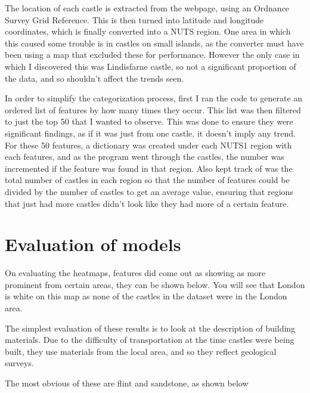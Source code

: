 \documentclass[11pt]{article}
\begin{document}
The location of each castle is extracted from the webpage, using an Ordnance Survey Grid Reference. This is then turned into latitude and longitude coordinates, which is finally converted into a NUTS region. One area in which this caused some trouble is in castles on small islands, as the converter must have been using a map that excluded these for performance. However the only case in which I discovered this was Lindisfarne castle, so not a significant proportion of the data, and so shouldn't affect the trends seen.

In order to simplify the categorization process, first I ran the code to generate an ordered list of features by how many times they occur. This list was then filtered to just the top 50 that I wanted to observe. This was done to ensure they were significant findings, as if it was just from one castle, it doesn't imply any trend. For these 50 features, a dictionary was created under each NUTS1 region with each features, and as the program went through the castles, the number was incremented if the feature was found in that region. Also kept track of was the total number of castles in each region so that the number of features could be divided by the number of castles to get an average value, ensuring that regions that just had more castles didn't look like they had more of a certain feature.


\section{Evaluation of models}

On evaluating the heatmaps, features did come out as showing as more prominent from certain areas, they can be shown below. You will see that London is white on this map as none of the castles in the dataset were in the London area.

The simplest evaluation of these results is to look at the description of building materials. Due to the difficulty of transportation at the time castles were being built, they use materials from the local area, and so they reflect geological surveys.

The most obvious of these are flint and sandstone, as shown below
\end{document}

